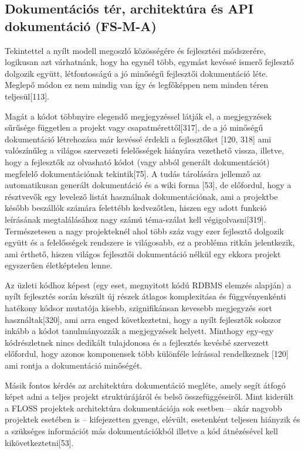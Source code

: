 \documentclass[12pt,magyar,a4paper,oneside]{scrreprt}
\begin{document}
\hypertarget{sec:FS-M-A}{%
\subsection{Dokumentációs tér, architektúra és API dokumentáció
(FS-M-A)}\label{sec:FS-M-A}}

Tekintettel a nyílt modell megoszló közösségére és fejlesztési
módszerére, logikusan azt várhatnánk, hogy ha egynél több, egymást
kevéssé ismerő fejlesztő dolgozik együtt, létfontosságú a jó minőségű
fejlesztői dokumentáció léte. Meglepő módon ez nem mindig van így és
legfőképpen nem minden téren teljesül{[}113{]}.

Magát a kódot többnyire elegendő megjegyzéssel látják el, a megjegyzések
sűrűsége független a projekt vagy csapatmérettől{[}317{]}, de a jó
minőségű dokumentáció létrehozása már kevéssé érdekli a fejlesztőket
{[}120, 318{]} ami valószínűleg a világos szervezeti felelősségek
hiányára vezethető vissza, illetve, hogy a fejlesztők az olvasható kódot
(vagy abból generált dokumentációt) megfelelő dokumentációnak
tekintik{[}75{]}. A tudás tárolására jellemző az automatikusan generált
dokumentáció és a wiki forma {[}53{]}, de előfordul, hogy a résztvevők
egy levelező listát használnak dokumentációnak, ami a projektbe később
beszállók számára felettébb kedvezőtlen, hiszen egy adott funkció
leírásának megtalálásához nagy számú téma-szálat kell
végigolvasni{[}319{]}. Természetesen a nagy projekteknél ahol több száz
vagy ezer fejlesztő dolgozik együtt és a felelősségek rendszere is
világosabb, ez a probléma ritkán jelentkezik, ami érthető, hiszen
világos fejlesztői dokumentáció nélkül egy ekkora projekt egyszerűen
életképtelen lenne.

Az üzleti kódhoz képest (egy eset, megnyitott kódú RDBMS elemzés
alapján) a nyílt fejlesztés során készült új részek átlagos komplexitása
és függvényenkénti hatékony kódsor mutatója kisebb, szignifikánsan
kevesebb megjegyzés sort használtak{[}320{]}, ami arra enged
következtetni, hogy a nyílt fejlesztők sokszor inkább a kódot
tanulmányozzák a megjegyzések helyett. Minthogy egy-egy kódrészletnek
nincs dedikált tulajdonosa és a fejlesztés kevésbé szervezett előfordul,
hogy azonos komponensek több különféle leírással rendelkeznek {[}120{]}
ami rontja a dokumentáció minőségét.

Másik fontos kérdés az architektúra dokumentáció megléte, amely segít
átfogó képet adni a teljes projekt struktúrájáról és belső
összefüggéseiről. Mint kiderült a FLOSS projektek architektúra
dokumentációja sok esetben -- akár nagyobb projektek esetében is --
kifejezetten gyenge, elévült, esetenként teljesen hiányzik és a
szükséges információt más dokumentációkból illetve a kód átnézésével
kell kikövetkeztetni{[}53{]}.
\end{document}
